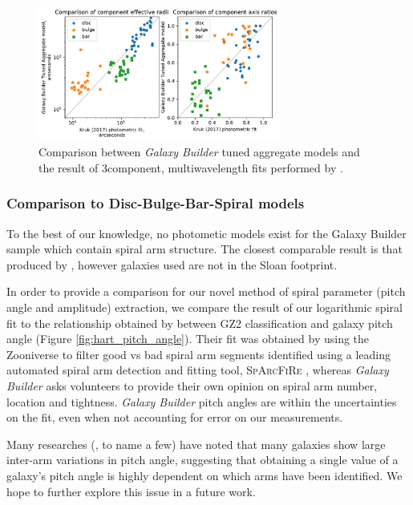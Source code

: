 \documentclass[../main.tex]{subfiles}
\begin{document}
\begin{figure}
  \includegraphics[width=8cm]{images__results/sd_comp_comparison.pdf}
  \caption{Comparison between \textit{Galaxy Builder} tuned aggregate models and the result of 3\-component, multi\-wavelength fits performed by \citet{Kruk2017:1710.00093v2}.}
  \label{fig:sd_comp_comparison}
\end{figure}


\subsubsection{Comparison to Disc-Bulge-Bar-Spiral models}
To the best of our knowledge, no photometic models exist for the Galaxy Builder sample which contain spiral arm structure. The closest comparable result is that produced by \citet{Gao2017:1709.00746v1}, however galaxies used are not in the Sloan footprint.

In order to provide a comparison for our novel method of spiral parameter (pitch angle and amplitude) extraction, we compare the result of our logarithmic spiral fit to the relationship obtained by \citet{Hart2016:1607.01019v1} between GZ2 classification and galaxy pitch angle (Figure \ref{fig:hart_pitch_angle}). Their fit was obtained by using the Zooniverse to filter good vs bad spiral arm segments identified using a leading automated spiral arm detection and fitting tool, \textsc{SpArcFiRe} \citep{Davis2014:1402.1910v1}, whereas \textit{Galaxy Builder} asks volunteers to provide their own opinion on spiral arm number, location and tightness. \textit{Galaxy Builder} pitch angles are within the uncertainties on the \citet{Hart2016:1607.01019v1} fit, even when not accounting for error on our measurements.

Many researches (\citealt{Davis2014:1402.1910v1}, \citealt{2019arXiv190804246D} to name a few) have noted that many galaxies show large inter-arm variations in pitch angle, suggesting that obtaining a single value of a galaxy's pitch angle is highly dependent on which arms have been identified. We hope to further explore this issue in a future work.
\end{document}
